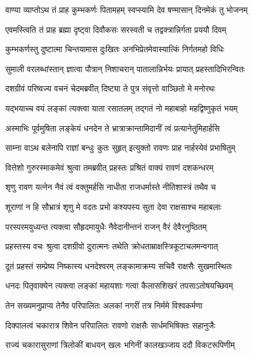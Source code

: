 \twolineshloka
{वाण्या व्याप्तोऽथ तं प्राह कुम्भकर्णः पितामहम्}
{स्वप्स्यामि देव षण्मासान् दिनमेकं तु भोजनम्} %

\twolineshloka
{एवमस्त्विति तं प्राह ब्रह्मा दृष्ट्वा दिवौकसः}
{सरस्वती च तद्वक्त्रान्निर्गता प्रययौ दिवम्} %

\twolineshloka
{कुम्भकर्णस्तु दुष्टात्मा चिन्तयामास दुःखितः}
{अनभिप्रेतमेवास्यात्किं निर्गतमहो विधिः} %

\twolineshloka
{सुमाली वरलब्धांस्तान् ज्ञात्वा पौत्रान् निशाचरान्}
{पातालान्निर्भयः प्रायात् प्रहस्तादिभिरन्वितः} %

\twolineshloka
{दशग्रीवं परिष्वज्य वचनं चेदमब्रवीत्}
{दिष्ट्या ते पुत्र संवृत्तो वाञ्छितो मे मनोरथः} %

\twolineshloka
{यद्भयाच्च वयं लङ्कां त्यक्त्वा याता रसातलम्}
{तद्गतं नो महाबाहो महद्विष्णुकृतं भयम्} %

\twolineshloka
{अस्माभिः पूर्वमुषिता लङ्केयं धनदेन ते}
{भ्रात्राक्रान्तामिदानीं त्वं प्रत्यानेतुमिहार्हसि} %

\twolineshloka
{साम्ना वाऽथ बलेनापि राज्ञां बन्धुः कुतः सुहृत्}
{इत्युक्तो रावणः प्राह नार्हस्येवं प्रभाषितुम्} %

\twolineshloka
{वित्तेशो गुरुरस्माकमेवं श्रुत्वा तमब्रवीत्}
{प्रहस्तः प्रश्रितं वाक्यं रावणं दशकन्धरम्} %

\twolineshloka
{शृणु रावण यत्नेन नैवं त्वं वक्तुमर्हसि}
{नाधीता राजधर्मास्ते नीतिशास्त्रं तथैव च} %

\twolineshloka
{शूराणां न हि सौभ्रात्रं शृणु मे वदतः प्रभो}
{कश्यपस्य सुता देवा राक्षसाश्च महाबलाः} %

\twolineshloka
{परस्परमयुध्यन्त त्यक्त्वा सौहृदमायुधैः}
{नैवेदानीन्तनं राजन् वैरं देवैरनुष्ठितम्} %

\twolineshloka
{प्रहस्तस्य वचः श्रुत्वा दशग्रीवो दुरात्मनः}
{तथेति क्रोधताम्राक्षस्त्रिकूटाचलमन्वगात्} %

\twolineshloka
{दूतं प्रहस्तं सम्प्रेष्य निष्कास्य धनदेश्वरम्}
{लङ्कामाक्रम्य सचिवै राक्षसैः सुखमास्थितः} %

\twolineshloka
{धनदः पितृवाक्येन त्यक्त्वा लङ्कां महायशाः}
{गत्वा कैलासशिखरं तपसाऽतोषयच्छिवम्} %

\twolineshloka
{तेन सख्यमनुप्राप्य तेनैव परिपालितः}
{अलकां नगरीं तत्र निर्ममे विश्वकर्मणा} %

\twolineshloka
{दिक्पालत्वं चकारात्र शिवेन परिपालितः}
{रावणो राक्षसैः सार्धमभिषिक्तः सहानुजैः} %

\twolineshloka
{राज्यं चकारासुराणां त्रिलोकीं बाधयन् खलः}
{भगिनीं कालखञ्जाय ददौ विकटरूपिणीम्} %

